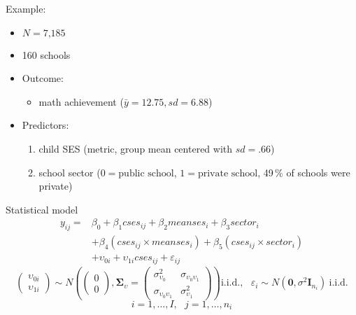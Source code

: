 \documentclass{beamer}
\newcommand{\vect}[1]{\mathbf{#1}}
\newcommand{\mat}[1]{\mathbf{#1}}
\newcommand{\gmat}[1]{\boldsymbol{#1}}
\begin{document}
\begin{frame}{Example: \citet{Bauer2005}}
  \begin{itemize}
    \item $N = \text{7,185}$
    \item 160 schools
    \item Outcome:
      \begin{itemize}
        \item math achievement ($\bar y = 12.75, sd = 6.88$)
      \end{itemize}
    \item Predictors:
      \begin{enumerate}
        \item child SES (metric, group mean centered with $sd = .66$)
        \item school sector ($0 = \text{public school}$, $1 = \text{private
          school}$, 49\,\% of schools were private)
      \end{enumerate}
  \end{itemize}
\end{frame}

\begin{frame}{Statistical model}
  \begin{align*}
    y_{ij} = & \beta_{0} + \beta_{1}cses_{ij} + \beta_{2}meanses_{i} +
    \beta_{3}sector_{i}\\
    & + \beta_{4}(cses_{ij} \times meanses_i) +
    \beta_5(cses_{ij}\times sector_i)\\
    & + \upsilon_{0i} + \upsilon_{1i}cses_{ij} + \varepsilon_{ij}
  \end{align*}
  \[
    \begin{pmatrix}
      \upsilon_{0i} \\
      \upsilon_{1i}
    \end{pmatrix}
    \sim N\left(
    \begin{pmatrix}
      0 \\
      0
    \end{pmatrix},
    \gmat{\Sigma}_{\upsilon} = 
    \begin{pmatrix}
      \sigma_{\upsilon_{0}}^2 & \sigma_{\upsilon_{0}\upsilon_1} \\
      \sigma_{\upsilon_{0}\upsilon_1} & \sigma_{\upsilon_{1}}^2
    \end{pmatrix}
    \right) \text{i.i.d.},~~~\varepsilon_i \sim N(\vect{0}, \sigma^2
    \mat{I}_{n_i})~\text{i.i.d.}
  \]
  \[
    i = 1,\dots,I, ~~~ j=1,\dots,n_i
  \]

\end{frame}
\end{document}
